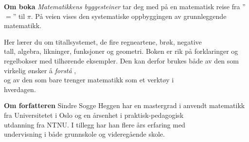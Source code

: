 


\newpage
\pagecolor{Cyan!30}
\thispagestyle{empty}
\large
\textbf{Om boka}\os
\textit{Matematikkens byggesteiner} tar deg med på en matematisk reise fra ''$=$'' til $\pi$. På veien vises den systematiske oppbyggingen av grunnleggende matematikk. \vsk

Her lærer du om titallsystemet, de fire regneartene, brøk, negative \\tall, algebra, likninger, funksjoner og geometri. Boken er rik på forklaringer og regelbokser med tilhørende eksempler. Den kan derfor brukes både av den som virkelig ønsker å \textit{forstå} , \\og av den som bare trenger matematikk som et verktøy i \\hverdagen.

\vsk \vsk


\textbf{Om forfatteren} \os
Sindre Sogge Heggen har en mastergrad i anvendt matematikk fra Universitetet i Oslo og en årsenhet i praktisk-pedagogisk\\ utdanning fra NTNU. I tillegg har han flere års erfaring med\\ undervisning i både grunnskole og videregående skole.

